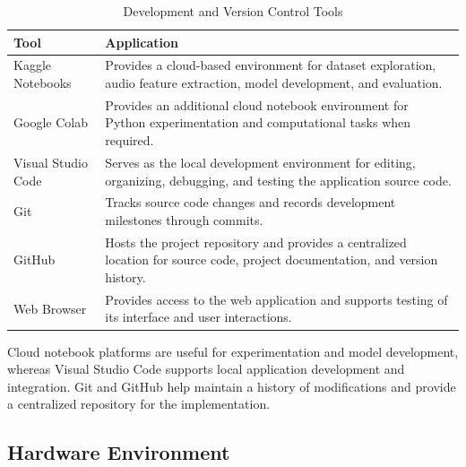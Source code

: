 \documentclass[12pt,a4paper]{report}
\begin{document}
\begin{table}[H]
\centering
\small
\renewcommand{\arraystretch}{1.35}

\begin{tabularx}{\textwidth}{
    >{\raggedright\arraybackslash}p{}
    >{\raggedright\arraybackslash}X
}
\toprule
\textbf{Tool} & \textbf{Application} \\
\midrule

Kaggle Notebooks &
Provides a cloud-based environment for dataset exploration, audio feature extraction, model development, and evaluation. \\

Google Colab &
Provides an additional cloud notebook environment for Python experimentation and computational tasks when required. \\

Visual Studio Code &
Serves as the local development environment for editing, organizing, debugging, and testing the application source code. \\

Git &
Tracks source code changes and records development milestones through commits. \\

GitHub &
Hosts the project repository and provides a centralized location for source code, project documentation, and version history. \\

Web Browser &
Provides access to the web application and supports testing of its interface and user interactions. \\

\bottomrule
\end{tabularx}

\caption{Development and Version Control Tools}
\label{tab:development-environment}
\end{table}

Cloud notebook platforms are useful for experimentation and model development, whereas Visual Studio Code supports local application development and integration. Git and GitHub help maintain a history of modifications and provide a centralized repository for the implementation.



\subsection{Hardware Environment}
\end{document}
